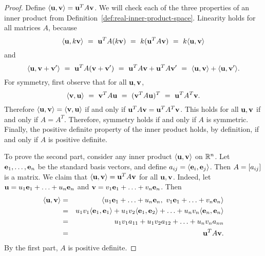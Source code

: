 \begin{proof}
  Define $\iprod{\vect{u},\vect{v}} = \vect{u}^T A \vect{v}$. We will
  check each of the three properties of an inner product from
  Definition~\ref{def:real-inner-product-space}. Linearity holds
  for all matrices $A$, because
  \begin{equation*}
    \iprod{\vect{u},k\vect{v}} 
    ~=~ \vect{u}^T A (k\vect{v}) 
    ~=~ k(\vect{u}^T A \vect{v}) 
    ~=~ k\iprod{\vect{u},\vect{v}}
  \end{equation*}
  and
  \begin{equation*}
    \iprod{\vect{u},\vect{v}+\vect{v}'} 
    ~=~ \vect{u}^T A (\vect{v}+\vect{v}') 
    ~=~ \vect{u}^T A \vect{v} + \vect{u}^T A \vect{v}' 
    ~=~ \iprod{\vect{u},\vect{v}} + \iprod{\vect{u},\vect{v}'}.
  \end{equation*}
  For symmetry, first observe that for all $\vect{u},\vect{v}$, 
  \begin{equation*}
    \iprod{\vect{v},\vect{u}}
    ~=~ \vect{v}^T A \vect{u}
    ~=~ (\vect{v}^T A \vect{u})^T
    ~=~ \vect{u}^T A^T \vect{v}.
  \end{equation*}
  Therefore $\iprod{\vect{u},\vect{v}}=\iprod{\vect{v},\vect{u}}$ if
  and only if $\vect{u}^T A \vect{v} = \vect{u}^T A^T \vect{v}$. This
  holds for all $\vect{u},\vect{v}$ if and only if $A=A^T$. Therefore,
  symmetry holds if and only if $A$ is symmetric.  Finally, the
  positive definite property of the inner product holds, by
  definition, if and only if $A$ is positive definite.

  To prove the second part, consider any inner product
  $\iprod{\vect{u},\vect{v}}$ on $\mathbb{R}^n$. Let
  $\vect{e}_1,\ldots,\vect{e}_n$ be the standard basis vectors, and
  define $a_{ij} = \iprod{\vect{e}_i,\vect{e}_j}$. Then
  $A=\left[a_{ij}\right]$ is a matrix. We claim that
  $\iprod{\vect{u},\vect{v}}=\vect{u}^TA\vect{v}$ for all
  $\vect{u},\vect{v}$. Indeed, let
  $\vect{u}=u_1\vect{e}_1+\ldots+u_n\vect{e}_n$ and
  $\vect{v}=v_1\vect{e}_1+\ldots+v_n\vect{e}_n$. Then
  \begin{eqnarray*}
    \iprod{\vect{u},\vect{v}}
    &=& \iprod{u_1\vect{e}_1+\ldots+u_n\vect{e}_n,~ v_1\vect{e}_1+\ldots+v_n\vect{e}_n}\\
    &=& u_1v_1\iprod{\vect{e}_1, \vect{e}_1}
    +   u_1v_2\iprod{\vect{e}_1, \vect{e}_2}
    + \ldots
    +   u_nv_n\iprod{\vect{e}_n, \vect{e}_n}\\
    &=& u_1v_1a_{11}
    +   u_1v_2a_{12}
    + \ldots
    +   u_nv_na_{nn}\\
    &=& \vect{u}^TA\vect{v}.
  \end{eqnarray*}
  By the first part, $A$ is positive definite.  
\end{proof}

